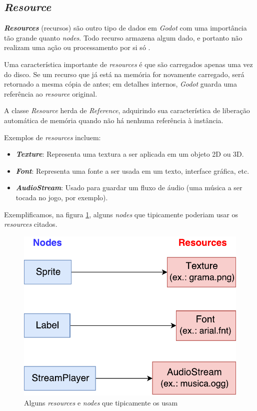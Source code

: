 
\subsection{\textit{Resource}}
\label{godotResource}

\textbf{\textit{Resources}} (recursos) são outro tipo de dados em \textit{Godot} com uma importância tão grande quanto \textit{nodes}. Todo recurso armazena algum dado, e portanto não realizam uma ação ou processamento por si só \citep{godotResource}.

Uma característica importante de \textit{resources} é que são carregados apenas uma vez do disco. Se um recurso que já está na memória for novamente carregado, será retornado a mesma cópia de antes; em detalhes internos, \textit{Godot} guarda uma referência ao \textit{resource} original.

A classe \textit{Resource} herda de \textit{Reference}, adquirindo sua característica de liberação automática de memória quando não há nenhuma referência à instância.

Exemplos de \textit{resources} incluem:

\begin{itemize}
\item \textbf{\textit{Texture}}: Representa uma textura a ser aplicada em um objeto 2D ou 3D.

\item \textbf{\textit{Font}}: Representa uma fonte a ser usada em um texto, interface gráfica, etc.

\item \textbf{\textit{AudioStream}}: Usado para guardar um fluxo de áudio (uma música a ser tocada no jogo, por exemplo).
\end{itemize}

Exemplificamos, na figura \ref{nodeResource}, alguns \textit{nodes} que tipicamente poderiam usar os \textit{resources} citados.

\begin{figure}[H]
  \centering
  \includegraphics[width=.5\textwidth]{image/resource.pdf}
  \caption{Alguns \textit{resources} e \textit{nodes} que tipicamente os usam \citep{godotResource}}
  \label{nodeResource}
\end{figure}

